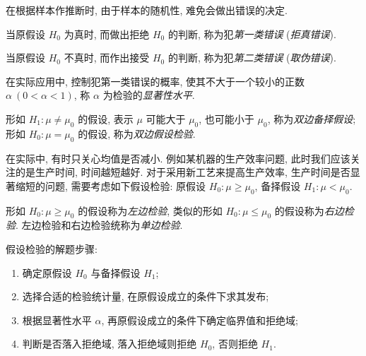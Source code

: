 在根据样本作推断时, 由于样本的随机性, 难免会做出错误的决定.

\begin{definition}[第一类错误]
    当原假设 $ H_{0} $ 为真时, 而做出拒绝 $ H_{0} $ 的判断, 称为犯\textit{第一类错误} (\textit{拒真错误}).
    \label{category_1Errors}
\end{definition}

\begin{definition}[第二类错误]
    当原假设 $ H_{0} $ 不真时, 而作出接受 $ H_{0} $ 的判断, 称为犯\textit{第二类错误} (\textit{取伪错误}).
\end{definition}

\begin{definition}[显著性水平]
    在实际应用中, 控制犯第一类错误的概率, 使其不大于一个较小的正数 $ \alpha~(0<\alpha<1)$, 称 $ \alpha $ 为检验的\textit{显著性水平}.
\end{definition}

\begin{definition}[双边备择假设与双边假设检验]
    形如 $ H_{1}: \mu \neq \mu_{0} $ 的假设, 表示 $ \mu $ 可能大于 $ \mu_{0} $, 也可能小于 $ \mu_{0}$, 称为\textit{双边备择假设};
    形如 $ H_{0}: \mu=\mu_{0} $ 的假设, 称为\textit{双边假设检验}.
\end{definition}

在实际中, 有时只关心均值是否减小. 例如某机器的生产效率问题, 此时我们应该关注的是生产时间, 时间越短越好.
对于采用新工艺来提高生产效率, 生产时间是否显著缩短的问题, 需要考虑如下假设检验:
原假设 $ H_{0}: \mu \geqslant \mu_{0}$, 备择假设 $ H_{1}: \mu<\mu_{0} .$

\begin{definition}[单边检验]
    形如 $ H_{0}: \mu \geqslant \mu_{0} $ 的假设称为\textit{左边检验}, 类似的形如 $ H_{0}: \mu \leqslant \mu_{0} $ 的假设称为\textit{右边检验}.
    左边检验和右边检验统称为\textit{单边检验}.
\end{definition}

假设检验的解题步骤:
\begin{enumerate}[label=(\arabic{*})]
    \item 确定原假设 $H_0$ 与备择假设 $H_1$;
    \item 选择合适的检验统计量, 在原假设成立的条件下求其发布;
    \item 根据显著性水平 $\alpha$, 再原假设成立的条件下确定临界值和拒绝域;
    \item 判断是否落入拒绝域, 落入拒绝域则拒绝 $H_0$, 否则拒绝 $H_1$.
\end{enumerate}

